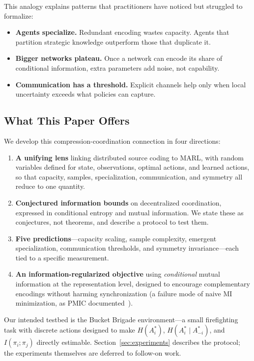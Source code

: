 \documentclass[10pt, letterpaper]{article}
\begin{document}
This analogy explains patterns that practitioners have noticed but struggled to formalize:
\begin{itemize}
    \item \textbf{Agents specialize.} Redundant encoding wastes capacity. Agents that partition strategic knowledge outperform those that duplicate it.
    \item \textbf{Bigger networks plateau.} Once a network can encode its share of conditional information, extra parameters add noise, not capability.
    \item \textbf{Communication has a threshold.} Explicit channels help only when local uncertainty exceeds what policies can capture.
\end{itemize}

\subsection*{What This Paper Offers}

We develop this compression-coordination connection in four directions:
\begin{enumerate}
    \item \textbf{A unifying lens} linking distributed source coding to MARL, with random variables defined for state, observations, optimal actions, and learned actions, so that capacity, samples, specialization, communication, and symmetry all reduce to one quantity.
    \item \textbf{Conjectured information bounds} on decentralized coordination, expressed in conditional entropy and mutual information. We state these as conjectures, not theorems, and describe a protocol to test them.
    \item \textbf{Five predictions}---capacity scaling, sample complexity, emergent specialization, communication thresholds, and symmetry invariance---each tied to a specific measurement.
    \item \textbf{An information-regularized objective} using \emph{conditional} mutual information at the representation level, designed to encourage complementary encodings without harming synchronization (a failure mode of naive MI minimization, as PMIC documented~\cite{li2022pmic}).
\end{enumerate}

Our intended testbed is the Bucket Brigade environment---a small firefighting task with discrete actions designed to make $H(A_i^*)$, $H(A_i^* \mid A_{-i}^*)$, and $I(\pi_i; \pi_j)$ directly estimable. Section~\ref{sec:experiments} describes the protocol; the experiments themselves are deferred to follow-on work.
\end{document}
